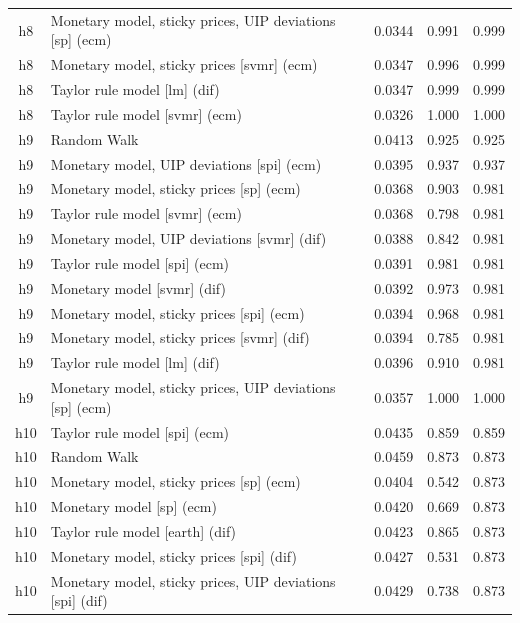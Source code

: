 \begin{ThreePartTable}
\begin{longtable}[t]{cp{5.5cm}ccc}
h8 & \raggedright Monetary model, sticky prices, UIP deviations [sp] (ecm) & 0.0344 & 0.991 & 0.999\\
h8 & \raggedright Monetary model, sticky prices [svmr] (ecm) & 0.0347 & 0.996 & 0.999\\
h8 & \raggedright Taylor rule model [lm] (dif) & 0.0347 & 0.999 & 0.999\\
h8 & \raggedright Taylor rule model [svmr] (ecm) & 0.0326 & 1.000 & 1.000\\
\addlinespace
h9 & \raggedright Random Walk & 0.0413 & 0.925 & 0.925\\
h9 & \raggedright Monetary model, UIP deviations [spi] (ecm) & 0.0395 & 0.937 & 0.937\\
h9 & \raggedright Monetary model, sticky prices [sp] (ecm) & 0.0368 & 0.903 & 0.981\\
h9 & \raggedright Taylor rule model [svmr] (ecm) & 0.0368 & 0.798 & 0.981\\
h9 & \raggedright Monetary model, UIP deviations [svmr] (dif) & 0.0388 & 0.842 & 0.981\\
h9 & \raggedright Taylor rule model [spi] (ecm) & 0.0391 & 0.981 & 0.981\\
h9 & \raggedright Monetary model [svmr] (dif) & 0.0392 & 0.973 & 0.981\\
h9 & \raggedright Monetary model, sticky prices [spi] (ecm) & 0.0394 & 0.968 & 0.981\\
h9 & \raggedright Monetary model, sticky prices [svmr] (dif) & 0.0394 & 0.785 & 0.981\\
h9 & \raggedright Taylor rule model [lm] (dif) & 0.0396 & 0.910 & 0.981\\
h9 & \raggedright Monetary model, sticky prices, UIP deviations [sp] (ecm) & 0.0357 & 1.000 & 1.000\\
\addlinespace
h10 & \raggedright Taylor rule model [spi] (ecm) & 0.0435 & 0.859 & 0.859\\
h10 & \raggedright Random Walk & 0.0459 & 0.873 & 0.873\\
h10 & \raggedright Monetary model, sticky prices [sp] (ecm) & 0.0404 & 0.542 & 0.873\\
h10 & \raggedright Monetary model [sp] (ecm) & 0.0420 & 0.669 & 0.873\\
h10 & \raggedright Taylor rule model [earth] (dif) & 0.0423 & 0.865 & 0.873\\
h10 & \raggedright Monetary model, sticky prices [spi] (dif) & 0.0427 & 0.531 & 0.873\\
h10 & \raggedright Monetary model, sticky prices, UIP deviations [spi] (dif) & 0.0429 & 0.738 & 0.873\\

\end{longtable}
\end{ThreePartTable}
